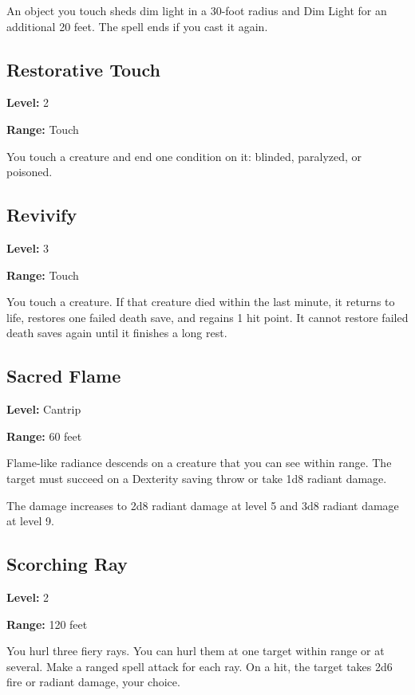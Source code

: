\documentclass[12pt,letterpaper,twocolumn,openany,nodeprecatedcode,bg=none]{dndbook}
\let\oldsubsection\subsection
\renewcommand{\subsection}[1]{%
  \needspace{5\baselineskip}%
  \oldsubsection{#1}%
}
\begin{document}
An object you touch sheds dim light in a 30-foot radius and Dim Light
for an additional 20 feet. The spell ends if you cast it again.

\subsection{Restorative Touch}\label{restorative-touch}

\textbf{Level:} 2

\textbf{Range:} Touch

You touch a creature and end one condition on it: blinded, paralyzed, or
poisoned.

\subsection{Revivify}\label{revivify}

\textbf{Level:} 3

\textbf{Range:} Touch

You touch a creature. If that creature died within the last minute, it
returns to life, restores one failed death save, and regains 1 hit
point. It cannot restore failed death saves again until it finishes a
long rest.

\subsection{Sacred Flame}\label{sacred-flame}

\textbf{Level:} Cantrip

\textbf{Range:} 60 feet

Flame-like radiance descends on a creature that you can see within
range. The target must succeed on a Dexterity saving throw or take 1d8
radiant damage.

The damage increases to 2d8 radiant damage at level 5 and 3d8 radiant
damage at level 9.

\subsection{Scorching Ray}\label{scorching-ray}

\textbf{Level:} 2

\textbf{Range:} 120 feet

You hurl three fiery rays. You can hurl them at one target within range
or at several. Make a ranged spell attack for each ray. On a hit, the
target takes 2d6 fire or radiant damage, your choice.
\end{document}
